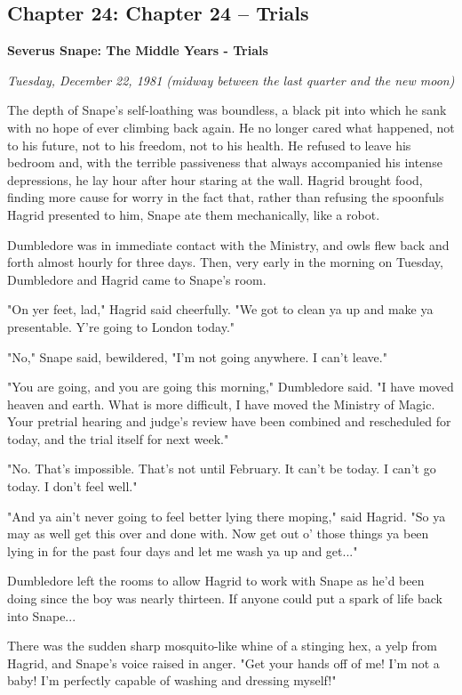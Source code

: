 \documentclass[a4paper,11pt]{article}
\begin{document}
\subsection{Chapter 24: Chapter 24 – Trials}

\textbf{Severus Snape: The Middle Years - Trials}

\emph{Tuesday, December 22, 1981 (midway between the last quarter and the new moon)}

The depth of Snape's self-loathing was boundless, a black pit into which he sank with no hope of ever climbing back again. He no longer cared what happened, not to his future, not to his freedom, not to his health. He refused to leave his bedroom and, with the terrible passiveness that always accompanied his intense depressions, he lay hour after hour staring at the wall. Hagrid brought food, finding more cause for worry in the fact that, rather than refusing the spoonfuls Hagrid presented to him, Snape ate them mechanically, like a robot.

Dumbledore was in immediate contact with the Ministry, and owls flew back and forth almost hourly for three days. Then, very early in the morning on Tuesday, Dumbledore and Hagrid came to Snape's room.

"On yer feet, lad," Hagrid said cheerfully. "We got to clean ya up and make ya presentable. Y're going to London today."

"No," Snape said, bewildered, "I'm not going anywhere. I can't leave."

"You are going, and you are going this morning," Dumbledore said. "I have moved heaven and earth. What is more difficult, I have moved the Ministry of Magic. Your pretrial hearing and judge's review have been combined and rescheduled for today, and the trial itself for next week."

"No. That's impossible. That's not until February. It can't be today. I can't go today. I don't feel well."

"And ya ain't never going to feel better lying there moping," said Hagrid. "So ya may as well get this over and done with. Now get out o' those things ya been lying in for the past four days and let me wash ya up and get..."

Dumbledore left the rooms to allow Hagrid to work with Snape as he'd been doing since the boy was nearly thirteen. If anyone could put a spark of life back into Snape...

There was the sudden sharp mosquito-like whine of a stinging hex, a yelp from Hagrid, and Snape's voice raised in anger. "Get your hands off of me! I'm not a baby! I'm perfectly capable of washing and dressing myself!"
\end{document}

